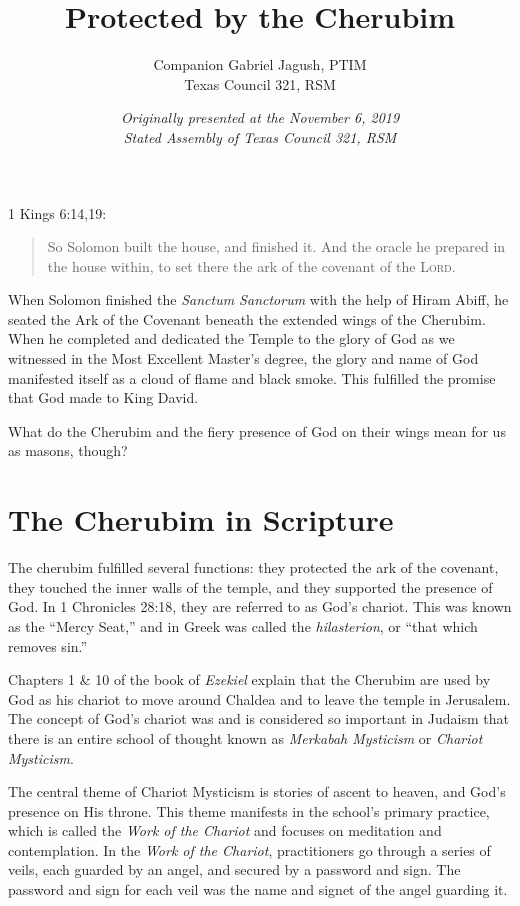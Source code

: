 \documentclass[letterpaper,11pt]{article}
\title{Protected by the Cherubim}
\author{Companion Gabriel Jagush, PTIM\\Texas Council \textnumero{} 321, RSM}
\date{\textit{Originally presented at the November 6, 2019\\Stated Assembly of Texas Council \textnumero{} 321, RSM}}
\begin{document}
	
	\maketitle
	
	1 Kings 6:14,19:
	
	\begin{quote}
		So Solomon built the house, and finished it. And the oracle he prepared in the house within, to set there the ark of the covenant of the \textsc{Lord}.
	\end{quote}

	When Solomon finished the \textit{Sanctum Sanctorum} with the help of Hiram Abiff, he seated the Ark of the Covenant beneath the extended wings of the Cherubim. When he completed and dedicated the Temple to the glory of God as we witnessed in the Most Excellent Master's degree, the glory and name of God manifested itself as a cloud of flame and black smoke. This fulfilled the promise that God made to King David.
	
	What do the Cherubim and the fiery presence of God on their wings mean for us as masons, though?
	
	\section*{The Cherubim in Scripture}
	
	The cherubim fulfilled several functions: they protected the ark of the covenant, they touched the inner walls of the temple, and they supported the presence of God. In 1 Chronicles 28:18, they are referred to as God's chariot. This was known as the ``Mercy Seat,'' and in Greek was called the \textit{hilasterion}, or ``that which removes sin.''
	
	Chapters 1 \& 10 of the book of \textit{Ezekiel} explain that the Cherubim are used by God as his chariot to move around Chaldea and to leave the temple in Jerusalem. The concept of God's chariot was and is considered so important in Judaism that there is an entire school of thought known as \textit{Merkabah Mysticism} or \textit{Chariot Mysticism}.
	
	The central theme of Chariot Mysticism is stories of ascent to heaven, and God's presence on His throne. This theme manifests in the school's primary practice, which is called the \textit{Work of the Chariot} and focuses on meditation and contemplation. In the \textit{Work of the Chariot}, practitioners go through a series of veils, each guarded by an angel, and secured by a password and sign. The password and sign for each veil was the name and signet of the angel guarding it.
	
\end{document}

